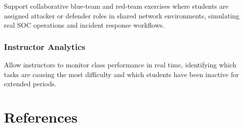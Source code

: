 \documentclass[12pt,a4paper]{report}
\begin{document}
Support collaborative blue-team and red-team exercises where students are assigned attacker or
defender roles in shared network environments, simulating real SOC operations and incident response
workflows.

\subsection{Instructor Analytics}

Allow instructors to monitor class performance in real time, identifying which tasks are causing the
most difficulty and which students have been inactive for extended periods.

\chapter{References}
\end{document}
